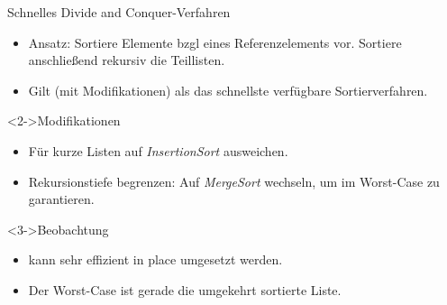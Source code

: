 \begin{frame}
    \begin{block}{Schnelles \alert{Divide and Conquer}-Verfahren}
        \begin{itemize}
            \item Ansatz: Sortiere Elemente bzgl eines Referenzelements vor. Sortiere anschließend rekursiv die Teillisten.
            \item Gilt (mit Modifikationen) als das schnellste verfügbare Sortierverfahren.
        \end{itemize}
    \end{block}
    \begin{block}<2->{Modifikationen}
        \begin{itemize}
            \item Für kurze Listen auf \emph{InsertionSort} ausweichen.
            \item Rekursionstiefe begrenzen: Auf \emph{MergeSort} wechseln, um \onlog im Worst-Case zu garantieren.
        \end{itemize}
    \end{block}
    \begin{block}<3->{Beobachtung}
        \begin{itemize}
            \item kann sehr effizient \alert{in place} umgesetzt werden.
            \item Der Worst-Case ist gerade die umgekehrt sortierte Liste.
        \end{itemize}
    \end{block}
\end{frame}
